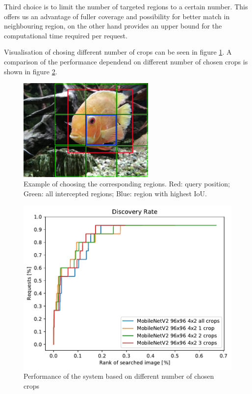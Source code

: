 Third choice is to limit the number of targeted regions to a certain number. This offers us an advantage of fuller coverage and possibility for better match in neighbouring region, on the other hand provides an upper bound for the computational time required per request. 

Visualisation of chosing different number of crops can be seen in figure \ref{fig:fish_with_grid}. A comparison of the performance dependend on different number of chosen crops is shown in figure \ref{fig:crop_limitation}.

\begin{figure}
\centering
\includegraphics[width=0.6\textwidth]{img/fish_grid_regions}
\caption{Example of choosing the corresponding regions. Red: query position; Green: all intercepted regions; Blue: region with highest IoU.}
\label{fig:fish_with_grid}
\end{figure}


\begin{figure}
\centering
\includegraphics[width=\textwidth]{graphs/c2cf4e147040018e6cfc46043bb59de4f5f3e83441c1e1024af0b7bab644a994}
\caption{Performance of the system based on different number of chosen crops}
\label{fig:crop_limitation}
\end{figure}


